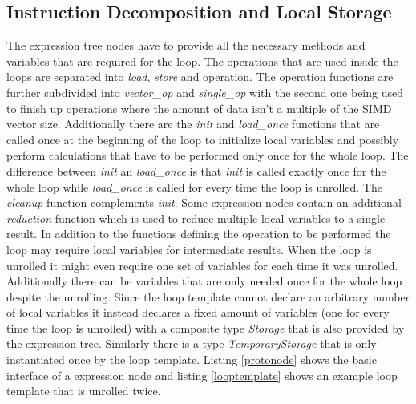 \documentclass[12pt]{article}
\begin{document}
\subsection{Instruction Decomposition and Local Storage}
The expression tree nodes have to provide all the necessary methods and variables
that are required for the loop. The operations that are used inside the loops are
separated into \emph{load}, \emph{store} and operation. The operation functions are
further subdivided into \emph{vector\_op} and \emph{single\_op} with the second
one being used to finish up operations where the amount of data
isn't a multiple of the SIMD vector size. Additionally there are the
\emph{init} and \emph{load\_once} functions
that are called once at the beginning of the loop to initialize local variables and
possibly perform calculations that have to be performed only once for the whole loop. 
The difference between \emph{init} an \emph{load\_once} is that \emph{init} is called exactly once for the whole
loop while \emph{load\_once} is called for every time the loop is unrolled. The
\emph{cleanup} function complements \emph{init}. Some expression nodes contain an additional \emph{reduction} function
which is used to reduce multiple local variables to a single result.
In addition to the functions defining the operation to be performed the loop may require local
variables for intermediate results. When the loop is unrolled it might even
require one set of variables for each time it was unrolled. Additionally there can
be variables that are only needed once for the whole loop despite the unrolling.
Since the loop template cannot declare an arbitrary number of local variables it
instead declares a fixed amount of variables (one for every time the loop is unrolled)
with a composite type \emph{Storage} that is also provided by the expression tree.
Similarly there is a type \emph{TemporaryStorage} that is only instantiated once
by the loop template. Listing \ref{protonode} shows the basic interface of a
expression node and listing \ref{looptemplate} shows an example loop template that
is unrolled twice.
\end{document}
